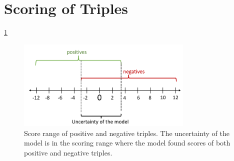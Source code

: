 \section{Scoring of Triples} \label{sec:scoring_of_triples}

\ref{fig:uncertainty}
\begin{figure}[t]
  \centering
    \includegraphics[width=0.75\textwidth]{figures/uncertainty.PNG}
  \caption{Score range of positive and negative triples.
  The uncertainty of the model is in the scoring range where the model found scores of both positive and negative triples.}
  \label{fig:uncertainty}
\end{figure}
